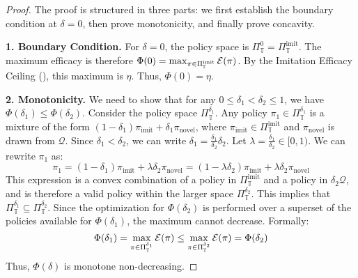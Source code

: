 \begin{proof}
The proof is structured in three parts: we first establish the boundary condition at $\delta=0$, then prove monotonicity, and finally prove concavity.

\noindent\textbf{1. Boundary Condition.}
For $\delta=0$, the policy space is $\Pi_{\mathbb{T}}^0 = \Pi_{\mathbb{T}}^{\text{imit}}$. The maximum efficacy is therefore $\Phi(0) = \max_{\pi \in \Pi_{\mathbb{T}}^{\text{imit}}} \mathcal{E}(\pi)$. By the Imitation Efficacy Ceiling (), this maximum is $\eta$. Thus, $\Phi(0)=\eta$.

\noindent\textbf{2. Monotonicity.}
We need to show that for any $0 \le \delta_1 < \delta_2 \le 1$, we have $\Phi(\delta_1) \le \Phi(\delta_2)$.
Consider the policy space $\Pi_{\mathbb{T}}^{\delta_1}$. Any policy $\pi_1 \in \Pi_{\mathbb{T}}^{\delta_1}$ is a mixture of the form $(1-\delta_1)\pi_{\text{imit}} + \delta_1\pi_{\text{novel}}$, where $\pi_{\text{imit}} \in \Pi_{\mathbb{T}}^{\text{imit}}$ and $\pi_{\text{novel}}$ is drawn from $\mathcal{Q}$.
Since $\delta_1 < \delta_2$, we can write $\delta_1 = \frac{\delta_1}{\delta_2} \delta_2$. Let $\lambda = \frac{\delta_1}{\delta_2} \in [0, 1)$. We can rewrite $\pi_1$ as:
\[
\pi_1 = (1-\delta_1)\pi_{\text{imit}} + \lambda\delta_2\pi_{\text{novel}} = (1-\lambda\delta_2)\pi_{\text{imit}} + \lambda\delta_2\pi_{\text{novel}}
\]
This expression is a convex combination of a policy in $\Pi_{\mathbb{T}}^{\text{imit}}$ and a policy in $\delta_2\mathcal{Q}$, and is therefore a valid policy within the larger space $\Pi_{\mathbb{T}}^{\delta_2}$.
This implies that $\Pi_{\mathbb{T}}^{\delta_1} \subseteq \Pi_{\mathbb{T}}^{\delta_2}$.
Since the optimization for $\Phi(\delta_2)$ is performed over a superset of the policies available for $\Phi(\delta_1)$, the maximum cannot decrease. Formally:
\[
\Phi(\delta_1) = \max_{\pi \in \Pi_{\mathbb{T}}^{\delta_1}} \mathcal{E}(\pi) \le \max_{\pi \in \Pi_{\mathbb{T}}^{\delta_2}} \mathcal{E}(\pi) = \Phi(\delta_2)
\]
Thus, $\Phi(\delta)$ is monotone non-decreasing.


\end{proof}
